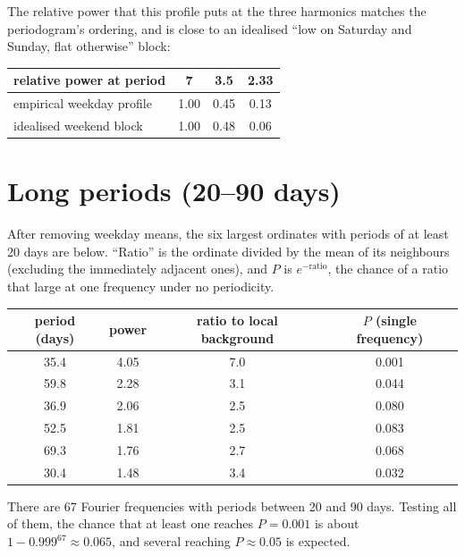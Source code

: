 \documentclass[11pt]{article}
\numberwithin{equation}{section}
\begin{document}
The relative power that this profile puts at the three harmonics matches the periodogram's ordering, and is close to an idealised ``low on Saturday and Sunday, flat otherwise'' block:

\begin{center}
\begin{tabular}{lccc}
\toprule
relative power at period & 7 & 3.5 & 2.33 \\
\midrule
empirical weekday profile & 1.00 & 0.45 & 0.13 \\
idealised weekend block & 1.00 & 0.48 & 0.06 \\
\bottomrule
\end{tabular}
\end{center}

\section{Long periods (20--90 days)}

After removing weekday means, the six largest ordinates with periods of at least 20 days are below. ``Ratio'' is the ordinate divided by the mean of its neighbours (excluding the immediately adjacent ones), and $P$ is $e^{-\text{ratio}}$, the chance of a ratio that large at one frequency under no periodicity.

\begin{center}
\begin{tabular}{cccc}
\toprule
period (days) & power & ratio to local background & $P$ (single frequency) \\
\midrule
35.4 & 4.05 & 7.0 & 0.001 \\
59.8 & 2.28 & 3.1 & 0.044 \\
36.9 & 2.06 & 2.5 & 0.080 \\
52.5 & 1.81 & 2.5 & 0.083 \\
69.3 & 1.76 & 2.7 & 0.068 \\
30.4 & 1.48 & 3.4 & 0.032 \\
\bottomrule
\end{tabular}
\end{center}

There are 67 Fourier frequencies with periods between 20 and 90 days. Testing all of them, the chance that at least one reaches $P = 0.001$ is about $1 - 0.999^{67} \approx 0.065$, and several reaching $P \approx 0.05$ is expected.
\end{document}
